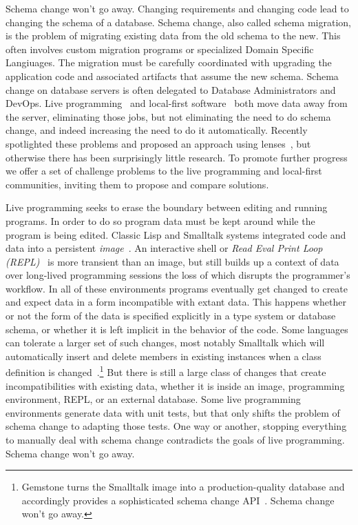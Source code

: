 \documentclass[english,submission]{programming}
\begin{document}
Schema change won't go away. Changing requirements and changing code lead to changing the schema of a database. Schema change, also called schema migration, is the problem of migrating existing data from the old schema to the new. This often involves custom migration programs or specialized Domain Specific Langiuages. The migration must be carefully coordinated with upgrading the application code and associated artifacts that assume the new schema. Schema change on database servers is often delegated to Database Administrators and DevOps. Live programming~\cite{tanimoto90,Hancock03} and local-first software~\cite{localfirst} both move data away from the server, eliminating those jobs, but not eliminating the need to do schema change, and indeed increasing the need to do it automatically. Recently \citet{Cambria} spotlighted these problems and proposed an approach using lenses~\cite{Foster2007}, but otherwise there has been surprisingly little research. To promote further progress we offer a set of challenge problems to the live programming and local-first communities, inviting them to propose and compare solutions.

Live programming seeks to erase the boundary between editing and running programs. In order to do so program data must be kept around while the program is being edited. Classic Lisp and Smalltalk systems integrated code and data into a persistent \textit{image}~\cite{Sandewall78, Goldberg80}. An interactive shell or \textit{Read Eval Print Loop (REPL)}~\cite{Deutsch64} is more transient than an image, but still builds up a context of data over long-lived programming sessions the loss of which disrupts the programmer's workflow. In all of these environments programs eventually get changed to create and expect data in a form incompatible with extant data. This happens whether or not the form of the data is specified explicitly in a type system or database schema, or whether it is left implicit in the behavior of the code. Some languages can tolerate a larger set of such changes, most notably Smalltalk which will automatically insert and delete members in existing instances when a class definition is changed~\cite[pp.252-272]{Goldberg80}.\footnote{Gemstone turns the Smalltalk image into a production-quality database and accordingly provides a sophisticated schema change API~\cite{Gemstone}. Schema change won't go away.} But there is still a large class of changes that create incompatibilities with existing data, whether it is inside an image, programming environment, REPL, or an external database. Some live programming environments generate data with unit tests, but that only shifts the problem of schema change to adapting those tests. One way or another, stopping everything to manually deal with schema change contradicts the goals of live programming. Schema change won't go away.
\end{document}
